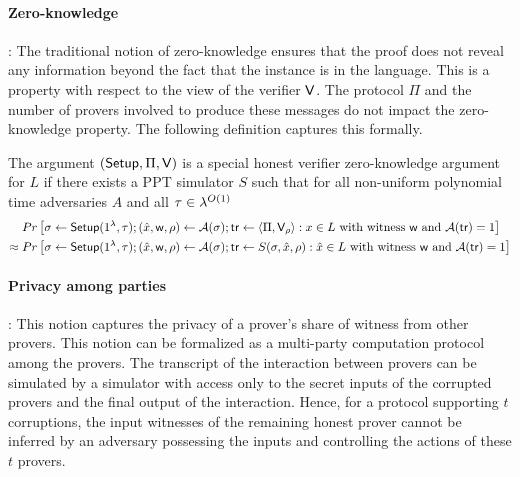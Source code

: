 \paragraph{Zero-knowledge}: 
The traditional notion of zero-knowledge ensures that the proof does not reveal any information beyond the fact that the instance is in the language.
This is a property with respect to the view of the verifier $\mathsf{V}$. The protocol $\Pi$ and the number of provers involved to produce these messages do not impact the zero-knowledge property. The following definition captures this formally.
\begin{definition}
The argument $(\mathsf{Setup}, \Pi, \mathsf{V})$ is a special honest verifier zero-knowledge argument for $L$ if there exists a PPT simulator $S$ such that for all non-uniform polynomial time adversaries $A$ and all $\tau \in {\lambda}^{O(1)}$ 
\begin{align*}
&Pr \left[ \sigma \leftarrow \mathsf{Setup}(1^{\lambda}, \tau); (\hat{x} ,\mathsf{w} ,\rho) \leftarrow \mathcal{A}(\sigma); \mathsf{tr} \leftarrow \langle \Pi, \mathsf{V}_\rho \rangle: x \in L \text{ with witness } \mathsf{w} \text{ and } \mathcal{A}(\mathsf{tr})=1 \right] \\
\approx \; &Pr \left[\sigma \leftarrow \mathsf{Setup}(1^{\lambda}, \tau); (\hat{x},\mathsf{w},\rho) \leftarrow \mathcal{A}(\sigma); \mathsf{tr} \leftarrow S(\sigma,\hat{x},\rho): \hat{x} \in L \text{ with witness } \mathsf{w} \text{ and } \mathcal{A}(\mathsf{tr}) = 1 \right]
\end{align*}
\end{definition}

\paragraph{Privacy among parties}:
This notion captures the privacy of a prover's share of witness from other provers. This notion can be formalized as a multi-party computation protocol among the provers. The transcript of the interaction between provers can be simulated by a simulator with access only to the secret inputs of the corrupted provers and the final output of the interaction. Hence, for a protocol supporting $t$ corruptions, the input witnesses of the remaining honest prover cannot be inferred by an adversary possessing the inputs and controlling the actions of these $t$ provers.


